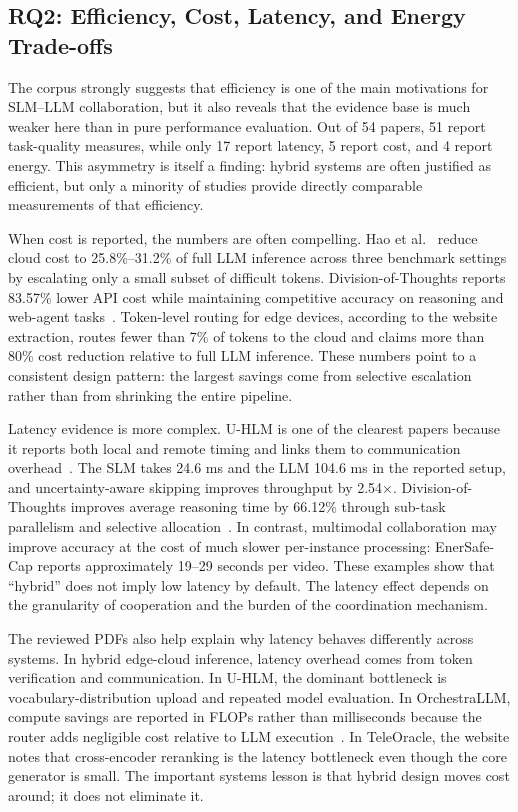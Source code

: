 \subsection{RQ2: Efficiency, Cost, Latency, and Energy Trade-offs}
The corpus strongly suggests that efficiency is one of the main motivations for SLM--LLM collaboration, but it also reveals that the evidence base is much weaker here than in pure performance evaluation. Out of 54 papers, 51 report task-quality measures, while only 17 report latency, 5 report cost, and 4 report energy. This asymmetry is itself a finding: hybrid systems are often justified as efficient, but only a minority of studies provide directly comparable measurements of that efficiency.

When cost is reported, the numbers are often compelling. Hao et al.~\cite{hao2024hybrid} reduce cloud cost to 25.8\%--31.2\% of full LLM inference across three benchmark settings by escalating only a small subset of difficult tokens. Division-of-Thoughts reports 83.57\% lower API cost while maintaining competitive accuracy on reasoning and web-agent tasks~\cite{shao2025dot}. Token-level routing for edge devices, according to the website extraction, routes fewer than 7\% of tokens to the cloud and claims more than 80\% cost reduction relative to full LLM inference. These numbers point to a consistent design pattern: the largest savings come from selective escalation rather than from shrinking the entire pipeline.

Latency evidence is more complex. U-HLM is one of the clearest papers because it reports both local and remote timing and links them to communication overhead~\cite{oh2025uncertainty}. The SLM takes 24.6 ms and the LLM 104.6 ms in the reported setup, and uncertainty-aware skipping improves throughput by 2.54$\times$. Division-of-Thoughts improves average reasoning time by 66.12\% through sub-task parallelism and selective allocation~\cite{shao2025dot}. In contrast, multimodal collaboration may improve accuracy at the cost of much slower per-instance processing: EnerSafe-Cap reports approximately 19--29 seconds per video. These examples show that ``hybrid'' does not imply low latency by default. The latency effect depends on the granularity of cooperation and the burden of the coordination mechanism.

The reviewed PDFs also help explain why latency behaves differently across systems. In hybrid edge-cloud inference, latency overhead comes from token verification and communication. In U-HLM, the dominant bottleneck is vocabulary-distribution upload and repeated model evaluation. In OrchestraLLM, compute savings are reported in FLOPs rather than milliseconds because the router adds negligible cost relative to LLM execution~\cite{lee2024orchestrallm}. In TeleOracle, the website notes that cross-encoder reranking is the latency bottleneck even though the core generator is small. The important systems lesson is that hybrid design moves cost around; it does not eliminate it.

